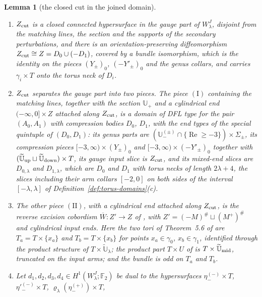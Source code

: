 \documentclass[11pt]{amsart}
\newtheorem{lemma}[theorem]{Lemma}
\theoremstyle{definition}
\theoremstyle{remark}
\theoremstyle{plain}
\numberwithin{equation}{section}
\newcommand{\FF}{\mathbb{F}_2}
\begin{document}
\begin{lemma}[the closed cut in the joined domain]\label{lem:closed-cut-embedding}
\begin{enumerate}[label=(\roman*)]
\item $Z_{\rm cut}$ is a closed connected hypersurface in the gauge part of
  $W^J_\lambda$, disjoint from the matching lines, the section and the supports of the
  secondary perturbations, and there is an orientation-preserving diffeomorphism
  $Z_{\rm cut}\cong Z=D_0\cup(-D_1)$, covered by a bundle isomorphism, which is the
  identity on the pieces $(Y_\pm)_0$, $(-Y'_\pm)_0$ and the genus collars, and carries
  $\gamma_i\times T$ onto the torus neck of $D_i$.
\item $Z_{\rm cut}$ separates the gauge part into two pieces. The piece $\mathrm{(I)}$
  containing the matching lines, together with the section $\mathbb U_+$ and a cylindrical
  end $(-\infty,0]\times Z$ attached along $Z_{\rm cut}$, is a domain of DFL type for the
  pair $(A_0,A_1)$ with compression bodies $D_0$, $D_1$, with the end types of the
  special quintuple of $(D_0,D_1)$: its genus parts are
  $(\mathbb U^{(\pm)}_-\cap\{\operatorname{Re}\ge-3\})\times\Sigma_\pm$, its compression pieces
  $[-3,\infty)\times(Y_\pm)_0$ and $[-3,\infty)\times(-Y'_\pm)_0$ together with
  $(\widetilde{\mathbb U}_{\rm up}\sqcup\widetilde{\mathbb U}_{\rm down})\times T$, its gauge input slice is $Z_{\rm cut}$, and
  its mixed-end slices are $D_{0,\lambda}$ and $D_{1,\lambda}$, which are $D_0$ and $D_1$ with
  torus necks of length $2\lambda+4$, the slices including their arm collars $[-2,0]$ on
  both sides of the interval $[-\lambda,\lambda]$ of Definition~\ref{def:torus-domains}(c).
\item The other piece $\mathrm{(II)}$, with a cylindrical end attached along $Z_{\rm cut}$, is
  the reverse excision cobordism $\overline W\colon Z'\to Z$ of
  \cite[Section~5.3]{KM-unknot}, with $Z'=(-M)^\#\sqcup(M^+)^\#$ and cylindrical input
  ends. Here the two tori of Theorem~5.6 of \cite{KM-unknot} are
  $T_a=T\times\{x_a\}$ and $T_b=T\times\{x_b\}$ for points $x_a\in\gamma_0$, $x_b\in\gamma_1$,
  identified through the product structure of $T\times\widetilde{\mathbb U}_\lambda$; the product
  part $T\times U$ of \cite[Figure~4]{KM-unknot} is $T\times\widetilde{\mathbb U}_{\rm mid}$, truncated
  on the input arms; and the bundle is odd on $T_a$ and $T_b$.
\item Let $d_1,d_2,d_3,d_4\in H^1(W^J_\lambda;\FF)$ be dual to the hypersurfaces
  $\eta^{(-)}_-\times T$, $\eta'^{(-)}_-\times T$, $\varrho_\lambda(\eta^{(+)}_-)\times T$,

\end{enumerate}
\end{lemma}
\end{document}
